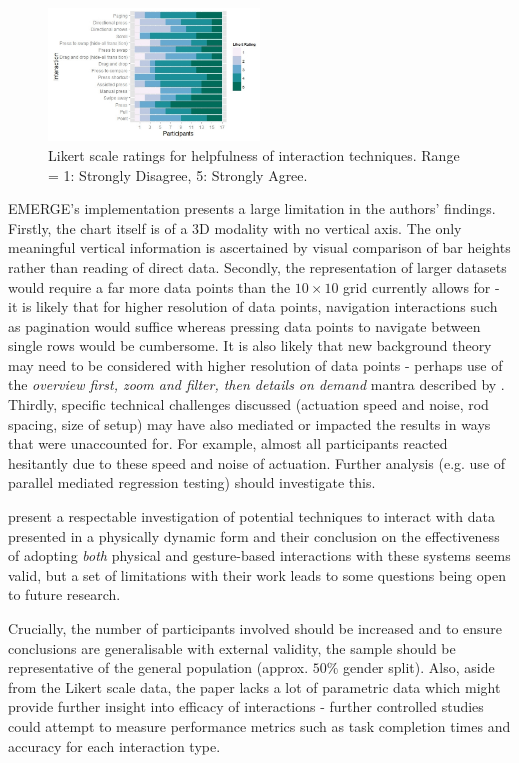 \documentclass[11pt]{article}
\begin{document}
\begin{figure}[H]
\centering
\includegraphics[width=0.5\textwidth]{img/taher2015-likert.png} 
\caption{Likert scale ratings for helpfulness of interaction
techniques. Range = 1: Strongly Disagree, 5: Strongly Agree.}\label{fig:taher2015-likert}
\end{figure}

EMERGE's implementation presents a large limitation in the authors' findings. Firstly, the chart itself is of a 3D modality with no vertical axis. The only meaningful vertical information is ascertained by visual comparison of bar heights rather than reading of direct data. Secondly, the representation of larger datasets would require a far more data points than the $10\times10$ grid currently allows for - it is likely that for higher resolution of data points, navigation interactions such as pagination would suffice whereas pressing data points to navigate between single rows would be cumbersome. It is also likely that new background theory may need to be considered with higher resolution of data points - perhaps use of the \textit{overview first, zoom and filter, then details on demand} mantra described by \citet{shneiderman1997}. Thirdly, specific technical challenges discussed (actuation speed and noise, rod spacing, size of setup) may have also mediated or impacted the results in ways that were unaccounted for. For example, almost all participants reacted hesitantly due to these speed and noise of actuation. Further analysis (e.g. use of parallel mediated regression testing) should investigate this.

\citet{taher2015} present a respectable investigation of potential techniques to interact with data presented in a physically dynamic form and their conclusion on the effectiveness of adopting \textit{both} physical and gesture-based interactions with these systems seems valid, but a set of limitations with their work leads to some questions being open to future research. 

Crucially, the number of participants involved should be increased and to ensure conclusions are generalisable with external validity, the sample should be representative of the general population (approx. $50\%$ gender split). Also, aside from the Likert scale data, the paper lacks a lot of parametric data which might provide further insight into efficacy of interactions - further controlled studies could attempt to measure performance metrics such as task completion times and accuracy for each interaction type.
\end{document}

